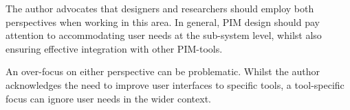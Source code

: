 The author advocates that designers and researchers should employ both perspectives when working in this area.  In general, PIM design should pay attention to accommodating user needs at the sub-system level, whilst also ensuring effective integration with other PIM-tools.

An over-focus on either perspective can be problematic. Whilst the author acknowledges the need to improve user interfaces to specific tools, a tool-specific focus can ignore user needs in the wider context.   
